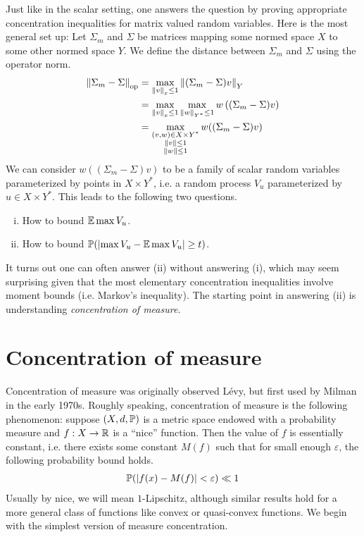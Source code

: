 \documentclass[11pt]{article}
\begin{document}
Just like in the scalar setting, one answers the question by proving appropriate concentration inequalities for matrix valued random variables.
Here is the most general set up: Let $\Sigma_m$ and $\Sigma$ be matrices mapping some normed space $X$ to some other normed space $Y$.
We define the distance between $\Sigma_m$ and $\Sigma$ using the operator norm.
\begin{align*}
  \norm{\Sigma_m - \Sigma}_{\mathrm{op}} &= \max_{\norm{v}_x \leq 1} \norm{(\Sigma_m-\Sigma)v}_Y \\
                               &= \max_{\norm{v}_x \leq 1} \max_{\norm{w}_{Y^{\ast}} \leq 1} w\left( (\Sigma_m - \Sigma)v \right) \\
                               &= \max_{\substack{(v, w) \in X \times Y^{\ast} \\ \norm{v} \leq 1 \\ \norm{w} \leq 1}} w((\Sigma_m - \Sigma)v)
\end{align*}
We can consider $w((\Sigma_m -\Sigma)v)$ to be a family of scalar random variables parameterized by points in $X \times Y^{\ast}$, i.e. a random process $V_u$ parameterized by $u \in X \times Y^{\ast}$.
This leads to the following two questions.
\begin{enumerate}[(i)]
\item How to bound $\E \max V_u$.
\item How to bound $\P(\left| \max V_u - \E \max V_u \right| \geq t)$.
\end{enumerate}
It turns out one can often answer (ii) without answering (i), which may seem surprising given that the most elementary concentration inequalities involve moment bounds (i.e. Markov's inequality).
The starting point in answering (ii) is understanding \emph{concentration of measure}.

\section{Concentration of measure}
\label{sec:conc-meas}

Concentration of measure was originally observed Lévy, but first used by Milman in the early 1970s.
Roughly speaking, concentration of measure is the following phenomenon: suppose $(X, d, \P)$ is a metric space endowed with a probability measure and $f: X \to \RR$ is a ``nice'' function.
Then the value of $f$ is essentially constant, i.e. there exists some constant $M(f)$ such that for small enough $\varepsilon$, the following probability bound holds.
\begin{align*}
  \P(|f(x) - M(f)| < \varepsilon) \ll 1
\end{align*}
Usually by nice, we will mean $1$-Lipschitz, although similar results hold for a more general class of functions like convex or quasi-convex functions.
We begin with the simplest version of measure concentration.
\end{document}
